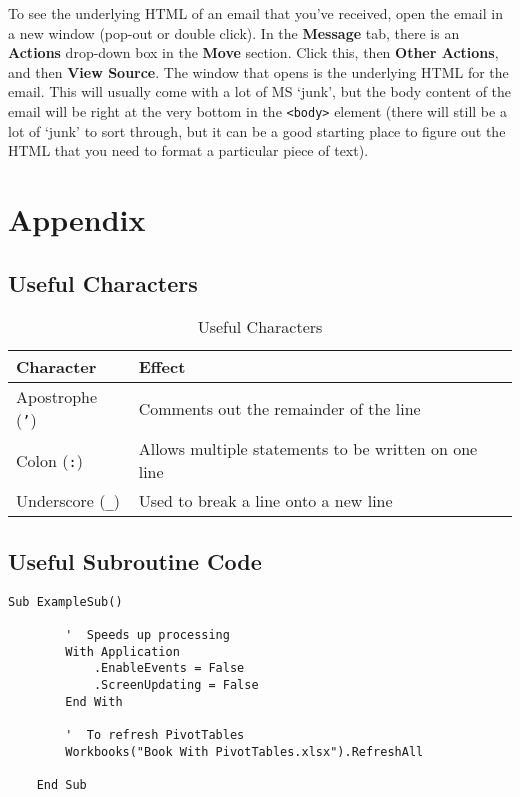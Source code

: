 \documentclass[11pt]{article}%
\begin{document}
To see the underlying HTML of an email that you've received, open the email in a new window (pop-out or double click). In the \textbf{Message} tab, there is an \textbf{Actions} drop-down box in the \textbf{Move} section. Click this, then \textbf{Other Actions}, and then \textbf{View Source}. The window that opens is the underlying HTML for the email. This will usually come with a lot of MS `junk', but the body content of the email will be right at the very bottom in the \texttt{<body>} element (there will still be a lot of `junk' to sort through, but it can be a good starting place to figure out the HTML that you need to format a particular piece of text).





\clearpage

\section*{Appendix}

\subsection*{Useful Characters}

\begin{table}[ht]
    \centering
    \begin{tabular}{l|l}
        Character & Effect \\\hline
        Apostrophe (\texttt{'})  & Comments out the remainder of the line \\
        Colon (\texttt{:})       & Allows multiple statements to be written on one line \\
        Underscore (\texttt{\_}) & Used to break a line onto a new line \\
    \end{tabular}
    \caption{Useful Characters}
    \label{tab:useful_chars}
\end{table}

\subsection*{Useful Subroutine Code}

\begin{lstlisting}[style=A]
    Sub ExampleSub()

        '  Speeds up processing
        With Application
            .EnableEvents = False
            .ScreenUpdating = False
        End With

        '  To refresh PivotTables
        Workbooks("Book With PivotTables.xlsx").RefreshAll

    End Sub
\end{lstlisting}

\clearpage

\end{document}
